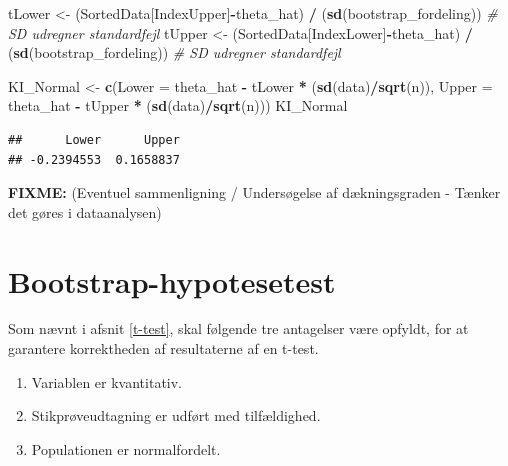 \documentclass[
]{book}
\newenvironment{Shaded}{\begin{snugshade}}{\end{snugshade}}
\newcommand{\CommentTok}[1]{\textcolor[rgb]{0.56,0.35,0.01}{\textit{#1}}}
\newcommand{\DataTypeTok}[1]{\textcolor[rgb]{0.13,0.29,0.53}{#1}}
\newcommand{\KeywordTok}[1]{\textcolor[rgb]{0.13,0.29,0.53}{\textbf{#1}}}
\newcommand{\NormalTok}[1]{#1}
\newcommand{\OperatorTok}[1]{\textcolor[rgb]{0.81,0.36,0.00}{\textbf{#1}}}
\newcommand{\StringTok}[1]{\textcolor[rgb]{0.31,0.60,0.02}{#1}}
\providecommand{\tightlist}{%
  \setlength{\itemsep}{0pt}\setlength{\parskip}{0pt}}
\theoremstyle{definition}
\theoremstyle{definition}
\theoremstyle{definition}
\theoremstyle{remark}
\begin{document}
\begin{Shaded}
\begin{Highlighting}[]
\NormalTok{tLower <-}\StringTok{ }\NormalTok{(SortedData[IndexUpper]}\OperatorTok{-}\NormalTok{theta_hat) }\OperatorTok{/}
\StringTok{  }\NormalTok{(}\KeywordTok{sd}\NormalTok{(bootstrap_fordeling)) }\CommentTok{# SD udregner standardfejl}
\NormalTok{tUpper <-}\StringTok{ }\NormalTok{(SortedData[IndexLower]}\OperatorTok{-}\NormalTok{theta_hat) }\OperatorTok{/}
\StringTok{  }\NormalTok{(}\KeywordTok{sd}\NormalTok{(bootstrap_fordeling)) }\CommentTok{# SD udregner standardfejl}

\NormalTok{KI_Normal <-}\StringTok{ }\KeywordTok{c}\NormalTok{(}\DataTypeTok{Lower =}\NormalTok{ theta_hat }\OperatorTok{-}\StringTok{ }\NormalTok{tLower }\OperatorTok{*}\StringTok{ }\NormalTok{(}\KeywordTok{sd}\NormalTok{(data)}\OperatorTok{/}\KeywordTok{sqrt}\NormalTok{(n)),}
               \DataTypeTok{Upper =}\NormalTok{ theta_hat }\OperatorTok{-}\StringTok{ }\NormalTok{tUpper }\OperatorTok{*}\StringTok{ }\NormalTok{(}\KeywordTok{sd}\NormalTok{(data)}\OperatorTok{/}\KeywordTok{sqrt}\NormalTok{(n)))}
\NormalTok{KI_Normal}
\end{Highlighting}
\end{Shaded}

\begin{verbatim}
##      Lower      Upper
## -0.2394553  0.1658837
\end{verbatim}

\textbf{FIXME:} (Eventuel sammenligning / Undersøgelse af dækningsgraden - Tænker det gøres i dataanalysen)

\hypertarget{bootstrap-hypotesetest}{%
\section{Bootstrap-hypotesetest}\label{bootstrap-hypotesetest}}

Som nævnt i afsnit \ref{t-test}, skal følgende tre antagelser være opfyldt, for at garantere korrektheden af resultaterne af en t-test.

\begin{enumerate}
\def\labelenumi{\arabic{enumi}.}
\tightlist
\item
  Variablen er kvantitativ.
\item
  Stikprøveudtagning er udført med tilfældighed.
\item
  Populationen er normalfordelt.
\end{enumerate}
\end{document}
